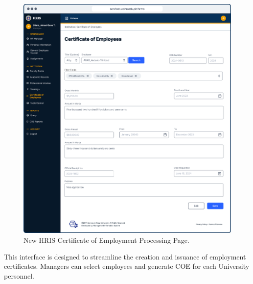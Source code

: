     \begin{figure}[H]
        \centering
        \includegraphics[width=1\linewidth]{figures/app/coe.png}
        \caption{New HRIS Certificate of Employment Processing Page.}
        \label{fig:app-coe}
    \end{figure}

    This interface is designed to streamline the creation and issuance of employment certificates. Managers can select employees and generate COE for each University personnel.
